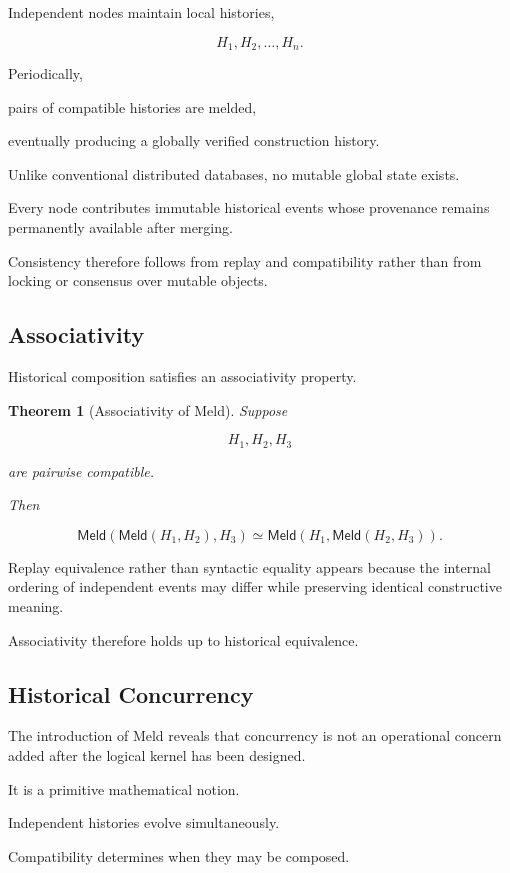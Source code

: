 \documentclass[12pt,oneside]{article}
\newtheorem{theorem}{Theorem}[section]
\theoremstyle{definition}
\theoremstyle{remark}
\newcommand{\Meld}{\mathsf{Meld}}
\begin{document}
Independent nodes maintain local histories,

\[
H_1,
H_2,
\ldots,
H_n.
\]

Periodically,

pairs of compatible histories are melded,

eventually producing a globally verified construction history.

Unlike conventional distributed databases, no mutable global state exists.

Every node contributes immutable historical events whose provenance remains
permanently available after merging.

Consistency therefore follows from replay and compatibility rather than from
locking or consensus over mutable objects.

\subsection{Associativity}

Historical composition satisfies an associativity property.

\begin{theorem}[Associativity of Meld]

Suppose

\[
H_1,
H_2,
H_3
\]

are pairwise compatible.

Then

\[
\Meld(\Meld(H_1,H_2),H_3)
\simeq
\Meld(H_1,\Meld(H_2,H_3)).
\]

\end{theorem}

Replay equivalence rather than syntactic equality appears because the internal
ordering of independent events may differ while preserving identical
constructive meaning.

Associativity therefore holds up to historical equivalence.

\subsection{Historical Concurrency}

The introduction of Meld reveals that concurrency is not an operational concern
added after the logical kernel has been designed.

It is a primitive mathematical notion.

Independent histories evolve simultaneously.

Compatibility determines when they may be composed.
\end{document}
